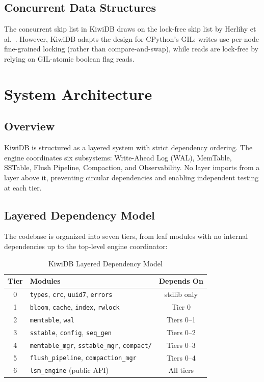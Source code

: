 \documentclass[conference]{IEEEtran}
\begin{document}
\subsection{Concurrent Data Structures}

The concurrent skip list in KiwiDB draws on the lock-free skip list by Herlihy et al.~\cite{herlihy2006}. However, KiwiDB adapts the design for CPython's GIL: writes use per-node fine-grained locking (rather than compare-and-swap), while reads are lock-free by relying on GIL-atomic boolean flag reads.

\section{System Architecture}
\label{sec:architecture}

\subsection{Overview}

KiwiDB is structured as a layered system with strict dependency ordering. The engine coordinates six subsystems: Write-Ahead Log (WAL), MemTable, SSTable, Flush Pipeline, Compaction, and Observability. No layer imports from a layer above it, preventing circular dependencies and enabling independent testing at each tier.

\subsection{Layered Dependency Model}

The codebase is organized into seven tiers, from leaf modules with no internal dependencies up to the top-level engine coordinator:

\begin{table}[H]
\centering
\caption{KiwiDB Layered Dependency Model}
\label{tab:layers}
\begin{tabular}{@{}clc@{}}
\toprule
\textbf{Tier} & \textbf{Modules} & \textbf{Depends On} \\
\midrule
0 & \texttt{types}, \texttt{crc}, \texttt{uuid7}, \texttt{errors} & stdlib only \\
1 & \texttt{bloom}, \texttt{cache}, \texttt{index}, \texttt{rwlock} & Tier 0 \\
2 & \texttt{memtable}, \texttt{wal} & Tiers 0--1 \\
3 & \texttt{sstable}, \texttt{config}, \texttt{seq\_gen} & Tiers 0--2 \\
4 & \texttt{memtable\_mgr}, \texttt{sstable\_mgr}, \texttt{compact/} & Tiers 0--3 \\
5 & \texttt{flush\_pipeline}, \texttt{compaction\_mgr} & Tiers 0--4 \\
6 & \texttt{lsm\_engine} (public API) & All tiers \\
\bottomrule
\end{tabular}
\end{table}
\end{document}
